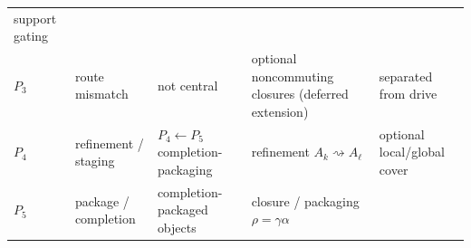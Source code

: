 \documentclass[11pt]{article}
\theoremstyle{definition}
\begin{document}
\begin{longtable}[]{@{}lllll@{}}
\begin{minipage}[t]{0.19\columnwidth}
support gating\strut
\end{minipage}\tabularnewline
\begin{minipage}[t]{0.05\columnwidth}\raggedright
\(P_{3}\)\strut
\end{minipage} & \begin{minipage}[t]{0.18\columnwidth}\raggedright
route mismatch\strut
\end{minipage} & \begin{minipage}[t]{0.20\columnwidth}\raggedright
not central\strut
\end{minipage} & \begin{minipage}[t]{0.25\columnwidth}\raggedright
optional noncommuting closures (deferred extension)\strut
\end{minipage} & \begin{minipage}[t]{0.19\columnwidth}\raggedright
separated from drive\strut
\end{minipage}\tabularnewline
\begin{minipage}[t]{0.05\columnwidth}\raggedright
\(P_{4}\)\strut
\end{minipage} & \begin{minipage}[t]{0.18\columnwidth}\raggedright
refinement / staging\strut
\end{minipage} & \begin{minipage}[t]{0.20\columnwidth}\raggedright
\(P_{4}\!\leftarrow\!P_{5}\) completion-packaging\strut
\end{minipage} & \begin{minipage}[t]{0.25\columnwidth}\raggedright
refinement \(A_{k}\rightsquigarrow A_{\ell}\)\strut
\end{minipage} & \begin{minipage}[t]{0.19\columnwidth}\raggedright
optional local/global cover\strut
\end{minipage}\tabularnewline
\begin{minipage}[t]{0.05\columnwidth}\raggedright
\(P_{5}\)\strut
\end{minipage} & \begin{minipage}[t]{0.18\columnwidth}\raggedright
package / completion\strut
\end{minipage} & \begin{minipage}[t]{0.20\columnwidth}\raggedright
completion-packaged objects\strut
\end{minipage} & \begin{minipage}[t]{0.25\columnwidth}\raggedright
closure / packaging \(\rho=\gamma\alpha\)\strut
\end{minipage} & \begin{minipage}[t]{0.19\columnwidth}\raggedright

\end{minipage}
\end{longtable}
\end{document}
